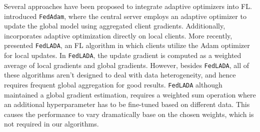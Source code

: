 Several approaches have been proposed to integrate adaptive optimizers into FL. \cite{reddi2020adaptive} introduced {\tt FedAdam}, where the central server employs an adaptive optimizer to update the global model using aggregated client gradients. Additionally, \cite{xie2019local} incorporates adaptive optimization directly on local clients. More recently, \cite{sun2023efficient} presented {\tt FedLADA}, an FL algorithm in which clients utilize the Adam optimizer for local updates. In {\tt FedLADA}, the update gradient is computed as a weighted average of local gradients and global gradients. However, besides {\tt FedLADA}, all of these algorithms aren't designed to deal with data heterogeneity, and hence requires frequent global aggregation for good results. {\tt FedLADA} although maintained a global gradient estimation, requires a weighted sum operation where an additional hyperparameter has to be fine-tuned based on different data. This causes the performance to vary dramatically base on the chosen weights, which is not required in our algorithms.